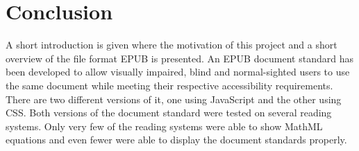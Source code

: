 \chapter{Conclusion}
\label{ch:Conclusion}

A short introduction is given where the motivation of this project and a short overview of the file format EPUB is presented. An EPUB document standard has been developed to allow visually impaired, blind and normal-sighted users to use the same document while meeting their respective accessibility requirements. There are two different versions of it, one using JavaScript and the other using CSS. Both versions of the document standard were tested on several reading systems. Only very few of the reading systems were able to show MathML equations and even fewer were able to display the document standards properly. 

